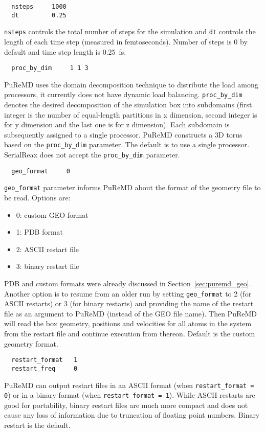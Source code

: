 \documentclass{article}
\begin{document}
\begin{verbatim}
  nsteps     1000
  dt         0.25
\end{verbatim}
{\tt nsteps} controls the total number of steps for the simulation and 
{\tt dt} controls the length of each time step (measured in femtoseconds). 
Number of steps is 0 by default and time step length is 0.25~fs.

\begin{verbatim}
  proc_by_dim     1 1 3
\end{verbatim}
PuReMD uses the domain decomposition technique to distribute the load
among processors, it currently does not have dynamic load balancing.
{\tt proc\_by\_dim} denotes the desired decomposition of the simulation 
box into subdomains (first integer is the number of equal-length 
partitions in x dimension, second integer is for y dimension and 
the last one is for z dimension). Each subdomain is subsequently assigned 
to a single processor. PuReMD constructs a 3D torus based on the 
{\tt proc\_by\_dim} parameter. The default is to use a single processor. 
SerialReax does not accept the {\tt proc\_by\_dim} parameter.

\begin{verbatim}
  geo_format     0
\end{verbatim}
{\tt geo\_format} parameter informs PuReMD about the format of the 
geometry file to be read. Options are:
\begin{itemize}
  \item 0: custom GEO format
  \item 1: PDB format
  \item 2: ASCII restart file
  \item 3: binary restart file
\end{itemize}
PDB and custom formats were already discussed in Section~\ref{sec:puremd_geo}.
Another option is to resume from an older run by setting {\tt geo\_format}
to 2 (for ASCII restarts) or 3 (for binary restarts) and providing the name 
of the restart file as an argument to PuReMD (instead of the GEO file name).
Then PuReMD will read the box geometry, positions and velocities for all 
atoms in the system from the restart file and continue execution from thereon. 
Default is the custom geometry format.

\begin{verbatim}
  restart_format   1
  restart_freq     0
\end{verbatim}
PuReMD can output restart files in an ASCII format (when 
{\tt restart\_format = 0}) or in a binary format (when {\tt restart\_format = 1}).
While ASCII restarts are good for portability, binary restart files are 
much more compact and does not cause any loss of information due to 
truncation of floating point numbers. Binary restart is the default.
\end{document}
